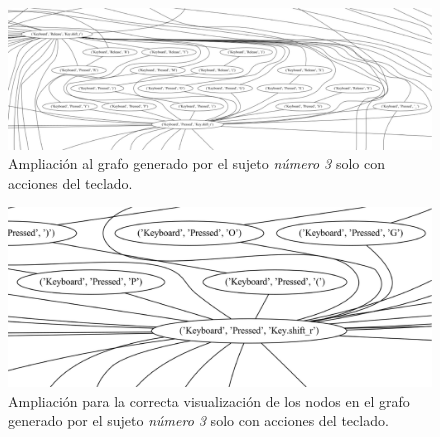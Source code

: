 \begin{frame}
\begin{figure}[h]
\centering
\includegraphics[width=1.0 \columnwidth]{Imagenes/ZoomKB150.eps}
\caption{Ampliaci\'on al grafo generado por el sujeto \emph{n\'umero 3} solo 
 con acciones del teclado.}
\label{fig:zoomKB}
\end{figure}
\end{frame}


\begin{frame}
\begin{figure}[h]
\centering
\includegraphics[width=1.0 \columnwidth]{Imagenes/MoreZKB150.eps}
\caption{Ampliaci\'on para la correcta visualizaci\'on de los nodos en el
 grafo generado por el sujeto \emph{n\'umero 3} solo con acciones del
 teclado.}
\label{fig:morezKB}
\end{figure}
\end{frame}

